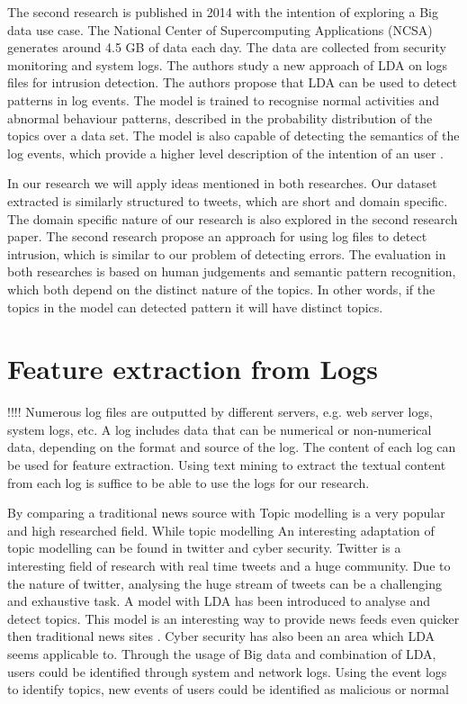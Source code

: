 The second research is published in 2014 with the intention of exploring a Big data use case. The National Center of Supercomputing Applications (NCSA) generates around 4.5 GB of data each day. The data are collected from security monitoring and system logs. The authors study a new approach of LDA on logs files for intrusion detection. The authors propose that LDA can be used to detect patterns in log events. The model is trained to recognise normal activities and abnormal behaviour patterns, described in the probability distribution of the topics over a data set. The model is also capable of detecting the semantics of the log events, which provide a higher level description of the intention of an user \cite{Jingwei2014KnowledgeLDA}. 

In our research we will apply ideas mentioned in both researches. Our dataset extracted is similarly structured to tweets, which are short and domain specific. The domain specific nature of our research is also explored in the second research paper. The second research propose an approach for using log files to detect intrusion, which is similar to our problem of detecting errors. The evaluation in both researches is based on human judgements and semantic pattern recognition, which both depend on the distinct nature of the topics. In other words, if the topics in the model can detected pattern it will have distinct topics.

\section{Feature extraction from Logs}\label{theory:featureextraction}
!!!!
Numerous log files are outputted by different servers, e.g. web server logs, system logs, etc. A log includes data that can be numerical or non-numerical data, depending on the format and source of the log. The content of each log can be used for feature extraction. Using text mining to extract the textual content from each log is suffice to be able to use the logs for our research.

\begin{comment}
\setlength{\parindent}{3ex}  When we view the 

\cite{Xu2009DetectingLogs}

\end{comment}

By comparing a traditional news source with
Topic modelling is a very popular and high researched field. While topic modelling  
An interesting adaptation of topic modelling can be found in twitter and cyber security. Twitter is a interesting field of research with real time tweets and a huge community. Due to the nature of twitter, analysing the huge stream of tweets can be a challenging and exhaustive task. A model with LDA has been introduced to analyse and detect topics. This model is an interesting way to provide news feeds even quicker then traditional news sites . Cyber security has also been an area which LDA seems applicable to. Through the usage of Big data and combination of LDA, users could be identified through system and network logs. Using the event logs to identify topics, new events of users could be identified as malicious or normal 


